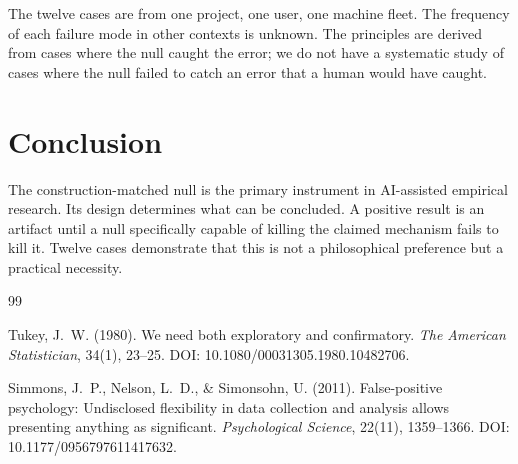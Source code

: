 \documentclass[11pt]{article}
\begin{document}
The twelve cases are from one project, one user, one machine fleet. The
frequency of each failure mode in other contexts is unknown. The
principles are derived from cases where the null caught the error; we do
not have a systematic study of cases where the null failed to catch an
error that a human would have caught.

\section{Conclusion}

The construction-matched null is the primary instrument in AI-assisted
empirical research. Its design determines what can be concluded. A
positive result is an artifact until a null specifically capable of
killing the claimed mechanism fails to kill it. Twelve cases demonstrate
that this is not a philosophical preference but a practical necessity.

\begin{thebibliography}{99}

Tukey, J.~W. (1980).
\newblock We need both exploratory and confirmatory.
\newblock \emph{The American Statistician}, 34(1), 23--25.
\newblock DOI: 10.1080/00031305.1980.10482706.

Simmons, J.~P., Nelson, L.~D., \& Simonsohn, U. (2011).
\newblock False-positive psychology: Undisclosed flexibility in data
collection and analysis allows presenting anything as significant.
\newblock \emph{Psychological Science}, 22(11), 1359--1366.
\newblock DOI: 10.1177/0956797611417632.

\end{thebibliography}
\end{document}

